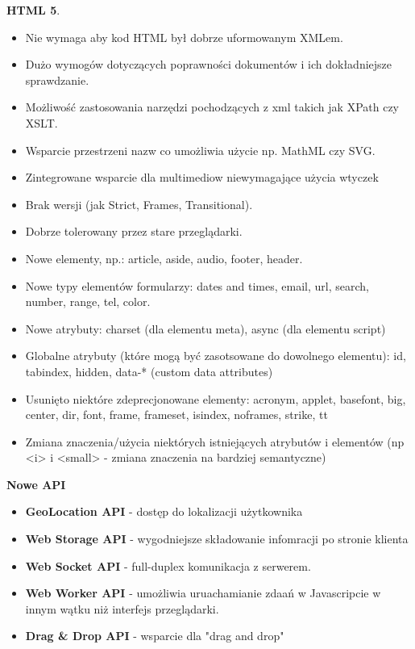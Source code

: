 \documentclass[../main.tex]{subfiles}
\begin{document}
    \textbf{HTML 5}.
    \begin{itemize}
        \item Nie wymaga aby kod HTML był dobrze uformowanym XMLem.
        \item Dużo wymogów dotyczących poprawności dokumentów i ich dokładniejsze sprawdzanie.
        \item Możliwość zastosowania narzędzi pochodzących z xml takich jak XPath czy XSLT.
        \item Wsparcie przestrzeni nazw co umożliwia użycie np. MathML czy SVG.
        \item Zintegrowane wsparcie dla multimediow niewymagające użycia wtyczek
        \item Brak wersji (jak Strict, Frames, Transitional).
        \item Dobrze tolerowany przez stare przeglądarki.
        \item Nowe elementy, np.: article, aside, audio, footer, header.
        \item Nowe typy elementów formularzy: dates and times, email, url, search, number, range, tel, color.
        \item Nowe atrybuty: charset (dla elementu meta), async (dla elementu script)
        \item Globalne atrybuty (które mogą być zasotsowane do dowolnego elementu): id, tabindex, hidden, data-* (custom data attributes)
        \item Usunięto niektóre zdeprecjonowane elementy: acronym, applet, basefont, big, center, dir, font, frame, frameset, isindex, noframes, strike, tt
        \item Zmiana znaczenia/użycia niektórych istniejących atrybutów i elementów (np <i> i <small> - zmiana znaczenia na bardziej semantyczne)
    \end{itemize}

    \textbf{Nowe API}
    \begin{itemize}
        \item \textbf{GeoLocation API} - dostęp do lokalizacji użytkownika
        \item \textbf{Web Storage API} - wygodniejsze składowanie infomracji po stronie klienta
        \item \textbf{Web Socket API} - full-duplex komunikacja z serwerem.
        \item \textbf{Web Worker API} - umożliwia uruachamianie zdaań w Javascripcie w innym wątku niż interfejs przeglądarki.
        \item \textbf{Drag \& Drop API} - wsparcie dla "drag and drop"
    \end{itemize}
\end{document}
